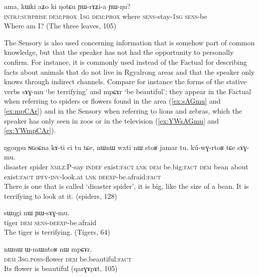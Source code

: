 \documentclass[oldfontcommands,oneside,a4paper,11pt]{article}
\newcommand{\ipa}[1]{{\phon \mbox{#1}}} %
\newcommand{\factual}[1]{\textsc{:fact}}
\begin{document}
\begin{exe}
\ex \label{ex:YWrAZia}
\gll 
\ipa{ama,}  	\ipa{kɯki}  	\ipa{aʑo}  	\ipa{ki}  	\ipa{ŋotɕu}  	\ipa{ɲɯ-rɤʑi-a}  	\ipa{ɲɯ-ŋu?}  \\
\textsc{intrj:surprise} \textsc{dem:prox} \textsc{1sg} \textsc{dem:prox} where \textsc{sens}-stay-\textsc{1sg} \textsc{sens}-be \\
\glt Where am I? (The three leaves, 105)
\end{exe}


The Sensory is also used concerning information that is somehow part of common knowledge, but that the speaker has not had the opportunity to personally confirm. For instance, it is commonly used instead of the Factual for describing facts about animals that do not live in Rgyalrong areas and that the speaker only knows through indirect channels. Compare for instance the forms of the stative verbs \ipa{sɤɣ-mu} `be terrifying' and \ipa{mpɕɤr} `be beautiful': they appear in the Factual when referring to  spiders or flowers found in the area (\ref{ex:sAGmu} and \ref{ex:mpCAr}) and in the Sensory when referring to lions and zebras, which the speaker has only seen in zoos or in the television  (\ref{ex:YWsAGmu} and \ref{ex:YWmpCAr}).

 
 
 \begin{exe}
\ex \label{ex:sAGmu}
\gll 
\ipa{ŋgoŋpu}  	\ipa{ɴɢoɕna}  	\ipa{kɤ-ti}  	\ipa{ci}  	\ipa{tu}  	\ipa{tɕe,}  	\ipa{nɯnɯ}  	\ipa{wxti}  	\ipa{nɯ}  	\ipa{stoʁ}  	\ipa{jamar}  	\ipa{tu.}  	\ipa{kú-wɣ-rtoʁ}  	\ipa{tɕe}  	\ipa{sɤɣ-mu.}  \\
disaster spider \textsc{nmlz}:P-say \textsc{indef} exist\factual{} \textsc{lnk} \textsc{dem} be.big\factual{} \textsc{dem} bean about exist\factual{} \textsc{ipfv-inv}-look.at \textsc{lnk} \textsc{deexp}-be.afraid\factual{}  \\
\glt There is one that is  called `disaster spider', it is big, like the size of a bean. It is terrifying to look at it. (spiders, 128)
\end{exe}

\begin{exe}
\ex \label{ex:YWsAGmu}
\gll 
\ipa{sɯŋgi}  	\ipa{nɯ}  	\ipa{ɲɯ-sɤɣ-mu.}  \\
tiger \textsc{dem} \textsc{sens-deexp}-be.afraid \\
\glt The tiger  is terrifying. (Tigers, 64)
\end{exe}


\begin{exe}
\ex \label{ex:mpCAr}
\gll
\ipa{nɯnɯ}  	\ipa{ɯ-mɯntoʁ}  	\ipa{nɯ}  	\ipa{mpɕɤr.}  \\
\textsc{dem} \textsc{3sg.poss}-flower \textsc{dem} be.beautiful\factual{} \\
\glt Its flower is beautiful (\ipa{qarɣɤpɤt}, 105)
\end{exe}
\end{document}
